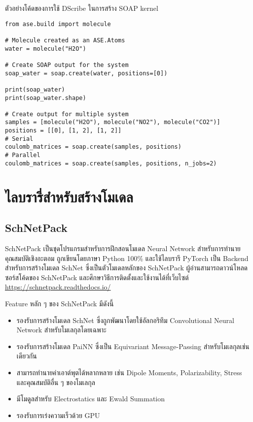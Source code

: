 \noindent ตัวอย่างโค้ดของการใช้ DScribe ในการสร้าง SOAP kernel

\begin{lstlisting}[style=MyPython]
from ase.build import molecule

# Molecule created as an ASE.Atoms
water = molecule("H2O")

# Create SOAP output for the system
soap_water = soap.create(water, positions=[0])

print(soap_water)
print(soap_water.shape)

# Create output for multiple system
samples = [molecule("H2O"), molecule("NO2"), molecule("CO2")]
positions = [[0], [1, 2], [1, 2]]
# Serial
coulomb_matrices = soap.create(samples, positions)
# Parallel     
coulomb_matrices = soap.create(samples, positions, n_jobs=2)
\end{lstlisting}

\section{ไลบรารี่สำหรับสร้างโมเดล}

\subsection{SchNetPack}

SchNetPack เป็นชุดโปรแกรมสำหรับการฝึกสอนโมเดล Neural Network สำหรับการทำนายคุณสมบัติเชิงอะตอม\autocite{schutt2019}
ถูกเขียนโดยภาษา Python 100\% และใช้ไลบรารี PyTorch เป็น Backend สำหรับการสร้างโมเดล SchNet ซึ่งเป็นตัวโมเดลหลักของ SchNetPack
ผู้อ่านสามารถดาวน์โหลดซอร์สโค้ดของ SchNetPack และศึกษาวิธีการติดตั้งและใช้งานได้ที่เว็บไซต์ \url{https://schnetpack.readthedocs.io/}

\noindent Feature หลัก ๆ ของ SchNetPack มีดังนี้

\begin{itemize}
    \item รองรับการสร้างโมเดล SchNet ซึ่งถูกพัฒนาโดยใช้อัลกอริทึม Convolutional Neural Network สำหรับโมเลกุลโดยเฉพาะ%
    \autocite{schutt2017,schutt2017a}
    \item รองรับการสร้างโมเดล PaiNN ซึ่งเป็น Equivariant Message-Passing สำหรับโมเลกุลเช่นเดียวกัน\autocite{schutt2021}
    \item สามารถทำนายค่าเอาต์พุตได้หลากหลาย เช่น Dipole Moments, Polarizability, Stress และคุณสมบัติอื่น ๆ ของโมเลกุล
    \item มีโมดูลสำหรับ Electrostatics และ Ewald Summation
    \item รองรับการเร่งความเร็วด้วย GPU
\end{itemize}

